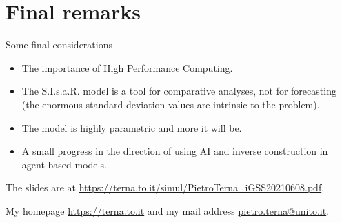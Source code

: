 \documentclass[9pt]{beamer}
\begin{document}
\section{Final remarks}

\begin{frame}{Some final considerations}

\begin{itemize}

\item
The importance of High Performance Computing.


\item The S.I.s.a.R. model is a tool for comparative analyses, not for forecasting (the enormous standard deviation values are intrinsic to the problem).


\item The model is highly parametric and more it will be.

\item A small progress in the direction of using AI and inverse construction in agent-based models.

\end{itemize}

 \bigskip
 The slides are at \url{https://terna.to.it/simul/PietroTerna_iGSS20210608.pdf}.
 
 My homepage \url{https://terna.to.it} and my mail address \url{pietro.terna@unito.it}.
 
\end{frame}
\end{document}
